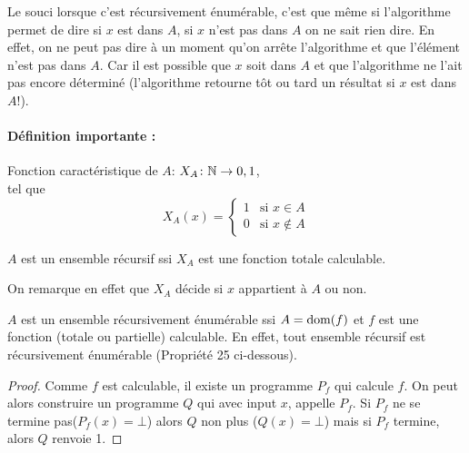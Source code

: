 \begin{myrem}
	Le souci lorsque c'est récursivement énumérable,
	c'est que même si l'algorithme permet de dire si $x$ est dans $A$, si $x$
	n'est pas dans $A$ on ne sait rien dire. En effet, on ne peut pas dire à un moment qu'on
	arrête l'algorithme et que l'élément n'est pas dans $A$.
       	Car il est possible que $x$ soit dans $A$ et que l'algorithme ne
	l'ait pas encore déterminé (l'algorithme retourne tôt ou tard un
	résultat si $x$ est dans $A$!).
\end{myrem}

\paragraph{Définition importante :}
\label{par:d_finition_importante}

\begin{mydef}
	Fonction caractéristique de $A$:
	$X_A \colon \mathbb{N} \to {0,1}$, \\
	tel que
    \[ X_A(x) =
      \begin{cases}
        1 & \text{si }x \in A \\
        0 & \text{si }x \notin A
      \end{cases}
    \]
\end{mydef}

\begin{myprop}
	$A$ est un ensemble récursif ssi $X_A$ est une fonction totale	calculable.

    On remarque en effet que $X_A$ décide si $x$ appartient à $A$ ou non.
\end{myprop}

\begin{myprop}
	$A$ est un ensemble récursivement énumérable ssi $A = \operatorname{dom}(f)$ et $f$ est une fonction (totale ou partielle) calculable. En effet, tout ensemble récursif est récursivement énumérable (Propriété 25 ci-dessous).

    \begin{proof}
      Comme $f$ est calculable,
      il existe un programme $P_f$ qui calcule $f$.
      On peut alors construire un programme $Q$ qui avec input $x$,
      appelle $P_f$.
      Si $P_f$ ne se termine pas($P_f(x) = \bot$) alors $Q$ non plus ($Q(x)= \bot$) mais si $P_f$ termine, alors $Q$ renvoie 1.
    \end{proof}
\end{myprop}

